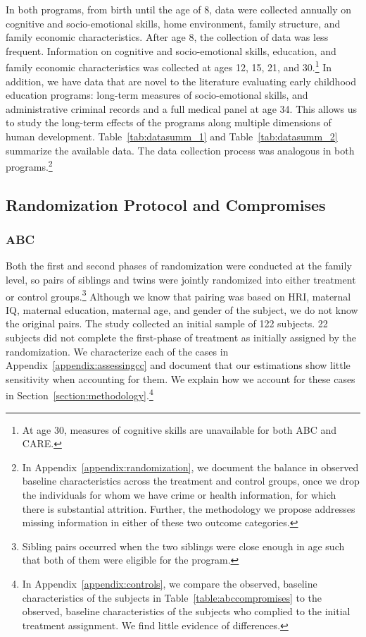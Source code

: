 \noindent In both programs, from birth until the age of 8, data were collected annually on cognitive and socio-emotional skills, home environment, family structure, and family economic characteristics. After age 8, the collection of data was less frequent. Information on cognitive and socio-emotional skills, education, and family economic characteristics was collected at ages 12, 15, 21, and 30.\footnote{At age 30, measures of cognitive skills are unavailable for both ABC and CARE.} In addition, we have data that are novel to the literature evaluating early childhood education programs: long-term measures of socio-emotional skills, and administrative criminal records and a full medical panel at age 34. This allows us to study the long-term effects of the programs along multiple dimensions of human development. Table~\ref{tab:datasumm_1} and Table~\ref{tab:datasumm_2} summarize the available data. The data collection process was analogous in both programs.\footnote{In Appendix~\ref{appendix:randomization}, we document the balance in observed baseline characteristics across the treatment and control groups, once we drop the individuals for whom we have crime or health information, for which there is substantial attrition. Further, the methodology we propose addresses missing information in either of these two outcome categories.}



\subsection{Randomization Protocol and Compromises} \label{section:randomization}

\subsubsection{ABC}

\noindent Both the first and second phases of randomization were conducted at the family level, so pairs of siblings and twins were jointly randomized into either treatment or control groups.\footnote{Sibling pairs occurred when the two siblings were close enough in age such that both of them were eligible for the program.} Although we know that pairing was based on HRI, maternal IQ, maternal education, maternal age, and gender of the subject, we do not know the original pairs. The study collected an initial sample of 122 subjects. 22 subjects did not complete the first-phase of treatment as initially assigned by the randomization. We characterize each of the cases in Appendix~\ref{appendix:assessingcc} and document that our estimations show little sensitivity when accounting for them. We explain how we account for these cases in Section~\ref{section:methodology}.\footnote{In Appendix~\ref{appendix:controls}, we compare the observed, baseline characteristics of the subjects in Table~\ref{table:abccompromises} to the observed, baseline characteristics of the subjects who complied to the initial treatment assignment. We find little evidence of differences.}\\


